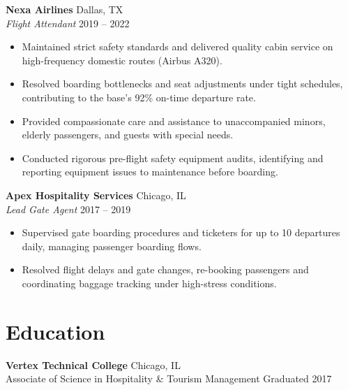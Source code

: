 \documentclass[10pt,letterpaper]{article}
\begin{document}
\textbf{Nexa Airlines} \hfill Dallas, TX \\
\textit{Flight Attendant} \hfill 2019 -- 2022
\begin{itemize}[leftmargin=1.5em, topsep=1pt, itemsep=1.5pt, parsep=0pt, partopsep=0pt]
    \item Maintained strict safety standards and delivered quality cabin service on high-frequency domestic routes (Airbus A320).
    \item Resolved boarding bottlenecks and seat adjustments under tight schedules, contributing to the base's 92\% on-time departure rate.
    \item Provided compassionate care and assistance to unaccompanied minors, elderly passengers, and guests with special needs.
    \item Conducted rigorous pre-flight safety equipment audits, identifying and reporting equipment issues to maintenance before boarding.
\end{itemize}

\vspace{6pt}

\textbf{Apex Hospitality Services} \hfill Chicago, IL \\
\textit{Lead Gate Agent} \hfill 2017 -- 2019
\begin{itemize}[leftmargin=1.5em, topsep=1pt, itemsep=1.5pt, parsep=0pt, partopsep=0pt]
    \item Supervised gate boarding procedures and ticketers for up to 10 departures daily, managing passenger boarding flows.
    \item Resolved flight delays and gate changes, re-booking passengers and coordinating baggage tracking under high-stress conditions.
\end{itemize}

\section{Education}
\textbf{Vertex Technical College} \hfill Chicago, IL \\
Associate of Science in Hospitality \& Tourism Management \hfill Graduated 2017
\end{document}
